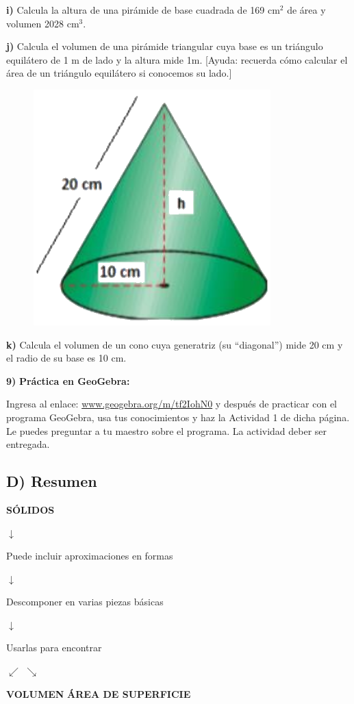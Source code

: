 \documentclass[12pt,a4paper]{article}
\begin{document}
\begin{multicols}{2}
\textbf{i)} Calcula la altura de una pirámide de base cuadrada de 169 cm$^2$ de área y volumen 2028 cm$^3$.

\textbf{j)} Calcula el volumen de una pirámide triangular cuya base es un triángulo equilátero de 1 m de lado y la altura mide 1m. [Ayuda: recuerda cómo calcular el área de un triángulo equilátero si conocemos su lado.]

\vspace{5mm}

 \begin{figure}
\centering
\vspace{-25pt}
\includegraphics[width=0.3\columnwidth]{Figuras/fig52.png}
\vspace{-20pt}
\end{figure}
\textbf{k)} Calcula el volumen de un cono cuya generatriz (su ``diagonal'') mide 20 cm y el radio de su base es 10 cm.

\vspace{5mm}

\textbf{9)} \textbf{Práctica en GeoGebra:}

Ingresa al enlace: \url{www.geogebra.org/m/tf2IohN0} y después de practicar con el programa GeoGebra, usa tus conocimientos y haz la Actividad 1 de dicha página. Le puedes preguntar a tu maestro sobre el programa. La actividad deber ser entregada.

\end{multicols}

\vspace{4mm}


\subsection*{D) Resumen}

\begin{center}
\textbf{SÓLIDOS}

$\downarrow$

Puede incluir aproximaciones en formas

$\downarrow$

Descomponer en varias piezas básicas

$\downarrow$

Usarlas para encontrar

$\swarrow$ \hspace{3cm} $\searrow$

\textbf{VOLUMEN} \hspace{2cm} \textbf{ÁREA DE SUPERFICIE}
\end{center}
\end{document}
